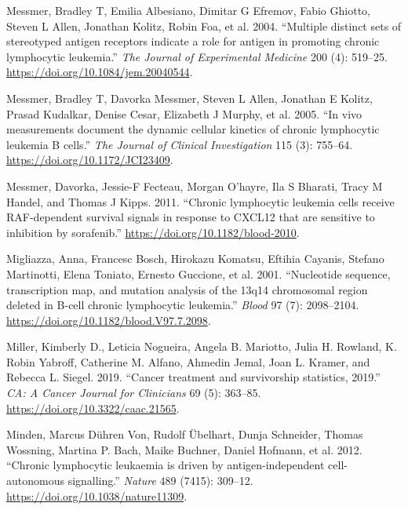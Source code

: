 \documentclass[11pt, a4paper, twosided]{book}
\newenvironment{CSLReferences}%
  {}%
  {\par}
\begin{document}
\begin{CSLReferences}{1}{0}
\leavevmode{}%
Messmer, Bradley T, Emilia Albesiano, Dimitar G Efremov, Fabio Ghiotto, Steven L Allen, Jonathan Kolitz, Robin Foa, et al. 2004. {``{Multiple distinct sets of stereotyped antigen receptors indicate a role for antigen in promoting chronic lymphocytic leukemia.}''} \emph{The Journal of Experimental Medicine} 200 (4): 519--25. \url{https://doi.org/10.1084/jem.20040544}.

\leavevmode{}%
Messmer, Bradley T, Davorka Messmer, Steven L Allen, Jonathan E Kolitz, Prasad Kudalkar, Denise Cesar, Elizabeth J Murphy, et al. 2005. {``{In vivo measurements document the dynamic cellular kinetics of chronic lymphocytic leukemia B cells.}''} \emph{The Journal of Clinical Investigation} 115 (3): 755--64. \url{https://doi.org/10.1172/JCI23409}.

\leavevmode{}%
Messmer, Davorka, Jessie-F Fecteau, Morgan O'hayre, Ila S Bharati, Tracy M Handel, and Thomas J Kipps. 2011. {``{Chronic lymphocytic leukemia cells receive RAF-dependent survival signals in response to CXCL12 that are sensitive to inhibition by sorafenib}.''} \url{https://doi.org/10.1182/blood-2010}.

\leavevmode{}%
Migliazza, Anna, Francesc Bosch, Hirokazu Komatsu, Eftihia Cayanis, Stefano Martinotti, Elena Toniato, Ernesto Guccione, et al. 2001. {``{Nucleotide sequence, transcription map, and mutation analysis of the 13q14 chromosomal region deleted in B-cell chronic lymphocytic leukemia}.''} \emph{Blood} 97 (7): 2098--2104. \url{https://doi.org/10.1182/blood.V97.7.2098}.

\leavevmode{}%
Miller, Kimberly D., Leticia Nogueira, Angela B. Mariotto, Julia H. Rowland, K. Robin Yabroff, Catherine M. Alfano, Ahmedin Jemal, Joan L. Kramer, and Rebecca L. Siegel. 2019. {``{Cancer treatment and survivorship statistics, 2019}.''} \emph{CA: A Cancer Journal for Clinicians} 69 (5): 363--85. \url{https://doi.org/10.3322/caac.21565}.

\leavevmode{}%
Minden, Marcus Dühren Von, Rudolf Übelhart, Dunja Schneider, Thomas Wossning, Martina P. Bach, Maike Buchner, Daniel Hofmann, et al. 2012. {``{Chronic lymphocytic leukaemia is driven by antigen-independent cell-autonomous signalling}.''} \emph{Nature} 489 (7415): 309--12. \url{https://doi.org/10.1038/nature11309}.


\end{CSLReferences}
\end{document}

